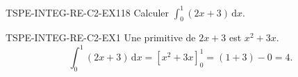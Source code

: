 

\begin{exercice}{TSPE-INTEG-RE-C2-EX1}{1}{8}
Calculer $\displaystyle\int_0^1 (2x+3)\,\mathrm{d}x$.
\end{exercice}


\begin{corrige}{TSPE-INTEG-RE-C2-EX1}
Une primitive de $2x+3$ est $x^2+3x$.
\[
  \int_0^1 (2x+3)\,\mathrm{d}x = [x^2+3x]_0^1 = (1+3)-0 = 4.
\]
\end{corrige}
